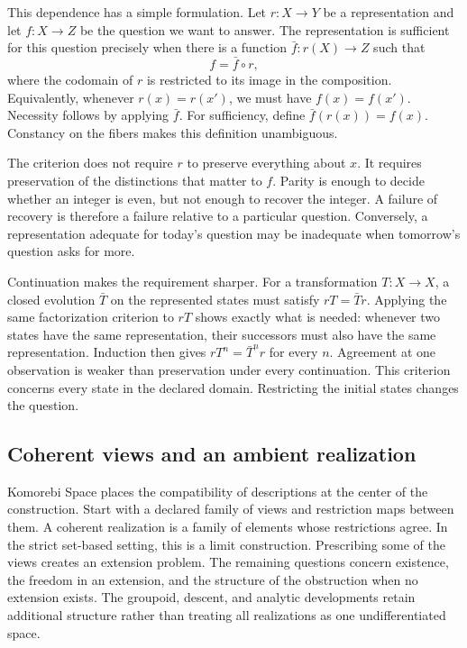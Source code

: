 This dependence has a simple formulation. Let \(r:X\to Y\) be a representation and let \(f:X\to Z\) be the question we want to answer. The representation is sufficient for this question precisely when there is a function \(\bar f:r(X)\to Z\) such that
\[
f=\bar f\circ r,
\]
where the codomain of \(r\) is restricted to its image in the composition. Equivalently, whenever \(r(x)=r(x')\), we must have \(f(x)=f(x')\). Necessity follows by applying \(\bar f\). For sufficiency, define \(\bar f(r(x))=f(x)\). Constancy on the fibers makes this definition unambiguous.

The criterion does not require \(r\) to preserve everything about \(x\). It requires preservation of the distinctions that matter to \(f\). Parity is enough to decide whether an integer is even, but not enough to recover the integer. A failure of recovery is therefore a failure relative to a particular question. Conversely, a representation adequate for today's question may be inadequate when tomorrow's question asks for more.

Continuation makes the requirement sharper. For a transformation \(T:X\to X\), a closed evolution \(\bar T\) on the represented states must satisfy \(rT=\bar T r\). Applying the same factorization criterion to \(rT\) shows exactly what is needed: whenever two states have the same representation, their successors must also have the same representation. Induction then gives \(rT^n=\bar T^n r\) for every \(n\). Agreement at one observation is weaker than preservation under every continuation. This criterion concerns every state in the declared domain. Restricting the initial states changes the question.

\subsection{Coherent views and an ambient realization}

Komorebi Space places the compatibility of descriptions at the center of the construction. Start with a declared family of views and restriction maps between them. A coherent realization is a family of elements whose restrictions agree. In the strict set-based setting, this is a limit construction. Prescribing some of the views creates an extension problem. The remaining questions concern existence, the freedom in an extension, and the structure of the obstruction when no extension exists. The groupoid, descent, and analytic developments retain additional structure rather than treating all realizations as one undifferentiated space.

